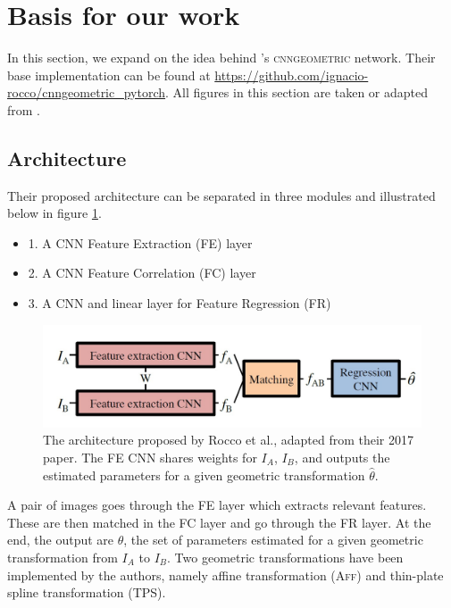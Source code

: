 \documentclass[10pt,conference,compsocconf]{IEEEtran}
\begin{document}
\vspace{-0.3cm}
\section{\textbf{Basis for our work}}
\label{rocco}
In this section, we expand on the idea behind \cite{roccoConvolutionalNeuralNetwork2017}'s \textsc{cnngeometric} network. Their base implementation can be found at \url{https://github.com/ignacio-rocco/cnngeometric_pytorch}. All figures in this section are taken or adapted from \cite{roccoConvolutionalNeuralNetwork2017}.

\subsection{Architecture}
Their proposed architecture can be separated in three modules and illustrated below in figure \ref{fig:network}.
\begin{itemize}
    \item 1. A CNN Feature Extraction (\textsc{FE}) layer
    \item 2. A CNN Feature Correlation (\textsc{FC}) layer 
    \item 3. A CNN and linear layer for Feature Regression (\textsc{FR})
\end{itemize}

\vspace{-.5cm}
\begin{figure}[h!]
    \centering
    \includegraphics[scale = 0.65]{network_adapted_from_rocco.jpg}
    \vspace{-0.3cm}
    \caption{The architecture proposed by Rocco et al., adapted from their 2017 paper. The FE CNN shares weights for $I_{A}$, $I_{B}$, and outputs the estimated parameters for a given geometric transformation $\hat{\theta}$.}
    \label{fig:network}
\end{figure}

A pair of images goes through the FE layer which extracts relevant features. These are then matched in the FC layer and go through the FR layer. At the end, the output are $\hat{\theta}$, the set of parameters estimated for a given geometric transformation from $I_{A}$ to $I_{B}$. Two geometric transformations have been implemented by the authors, namely affine transformation (\textsc{Aff}) and thin-plate spline transformation (\textsc{TPS}).
\end{document}
